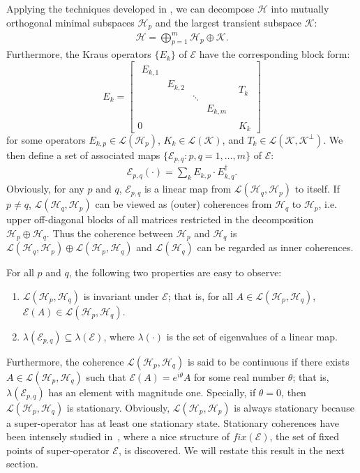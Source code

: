 \documentclass[journal]{IEEEtran}
\def\h{\ensuremath{\mathcal{H}}}
\def\l{\ensuremath{\mathcal{L}}}
\def\k{\ensuremath{\mathcal{K}}}
\def\e{\ensuremath{\mathcal{E}}}
\def\l{\ensuremath{\mathcal{L}}}
\def\l{\mathcal{L}}
\def\k{\mathcal{K}}
\begin{document}
Applying the techniques developed in \cite{ying2013reachability,baumgartner2012structure}, we can decompose $\h$ into mutually orthogonal minimal subspaces $\h_p$ and the largest transient subspace $\k$: 
\begin{eqnarray}\label{eq_mini_dec}
  \h=\bigoplus_{p=1}^m\h_p\oplus\k.
\end{eqnarray}
Furthermore, the Kraus operators $\{E_k\}$ of $\e$ have the  corresponding block form:
$$\renewcommand{\arraystretch}{1.2}
E_k=\left[\begin{array}{c|c}
  \begin{array}{cccc}
  E_{k,1} & & &\\
  & E_{k,2}  & &\\
  & & \ddots &\\
  & & & E_{k,m}  
  \end{array} & T_k\\
  \hline
0&K_k
\end{array}\right]$$
 for some operators $E_{k,p}\in \l(\h_p)$, $K_k\in \l(\k)$, and $T_k\in \l(\k,\k^{\perp}).$
We then define a set of associated maps $\{\e_{p,q} : p,q = 1, \dots, m\}$ of $\e$:
\begin{eqnarray}\label{Eq_ass_maps}
  \e_{p,q}(\cdot)=\sum_{k} E_{k,p}\cdot E_{k,q}^\dagger.
\end{eqnarray}
Obviously, for any $p$ and $q$, $\e_{p,q}$ is a linear  map from $\l(\h_q,\h_p)$ to itself. If $p\not =q$, $\l(\h_q, \h_p)$ can  be viewed as (outer) coherences from  $\h_q$ to $\h_p$, i.e.  upper off-diagonal blocks of all matrices restricted in the decomposition $\h_p\oplus\h_q.$ Thus the coherence between $\h_p$ and $\h_q$ is  $\l(\h_q, \h_p)\oplus\l(\h_p, \h_q)$ and $\l(\h_q)$ can be regarded as inner coherences.

For all $p$ and $q$, the following two properties are easy to observe:
\begin{enumerate}
\item $\l(\h_p,\h_q)$ is invariant under $\e$; that is, for all $A\in \l(\h_p,\h_q)$, $\e(A)\in \l(\h_p,\h_q)$.
\item  $\lambda(\e_{p,q})\subseteq \lambda(\e)$, where $\lambda(\cdot)$ is the set of eigenvalues of a linear map.
\end{enumerate}
Furthermore,  the coherence $\l(\h_p,\h_q)$ is said to be continuous if there exists $A\in \l(\h_p,\h_q)$ such that $\e(A)=e^{i\theta}A$ for some real number $\theta$; that is, $\lambda(\e_{p,q})$ has an element with magnitude one.  Specially, if $\theta=0$, then $\l(\h_p,\h_q)$ is stationary. Obviously, $\l(\h_p,\h_p)$ is always stationary because a super-operator has at least one stationary state. Stationary coherences have been intensely studied in~\cite{baumgartner2012structure}, where a nice structure of $fix(\e)$, the set of fixed points of super-operator $\e$, is discovered. We will restate this result in the next section.
\end{document}
